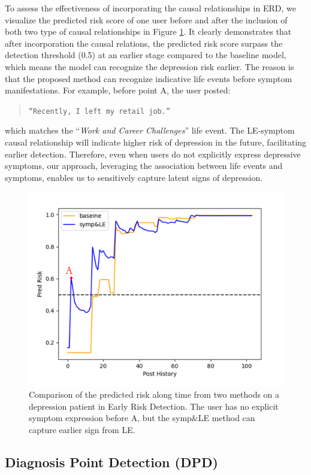 To assess the effectiveness of incorporating the causal relationships in ERD, we visualize the predicted risk score of one user before and after the inclusion of both two type of causal relationships in Figure \ref{fig:case_ERD}. It clearly demonstrates that after incorporation the causal relations, the predicted risk score surpass the detection threshold (0.5) at an earlier stage compared to the baseline model, which means the model can recognize the depression risk earlier. The reason is that the proposed method can recognize indicative life events before symptom manifestations. For example, before point A, the user posted:
\begin{quote}
\small\texttt{``Recently, I left my retail job.''}
\end{quote}
which matches the ``\textit{Work and Career Challenges}'' life event. The LE-symptom causal relationship will indicate higher risk of depression in the future, facilitating earlier detection. Therefore, even when users do not explicitly express depressive symptoms, our approach, leveraging the association between life events and symptoms, enables us to sensitively capture latent signs of depression. 
\begin{figure}[th]
	\centering
 \includegraphics[width=\linewidth]{figures/case_ERD.png}
	\caption{Comparison of the predicted risk along time from two methods on a depression patient in Early Risk Detection. The user has no explicit symptom expression before A, but the symp\&LE method can capture earlier sign from LE.}
	\label{fig:case_ERD}
\end{figure}
\subsection{Diagnosis Point Detection (DPD)}
